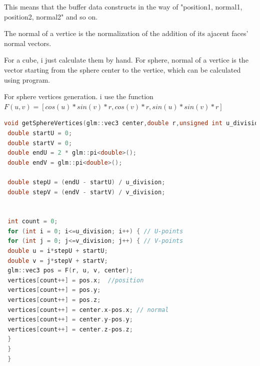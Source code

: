 \documentclass[acmtog]{acmart}
\begin{document}
\par This means that the buffer data constructs in the way of "position1, normal1, position2, normal2" and so on.
\par The normal of a vertice is the normalization of the  addition of its ajacent faces' normal vectors.
\par For a cube, i just calculate them by hand. For sphere, normal of a vertice is the vector starting from the sphere center to the vertice, which can be calculated using program.
\\\par
 For sphere vertices generation. i use the function $F(u, v) = [ cos(u)*sin(v)*r, cos(v)*r, sin(u)*sin(v)*r ]$
 \begin{lstlisting}[frame=single,breaklines=true,language=c++,basicstyle=\footnotesize\ttfamily]
 void getSphereVertices(glm::vec3 center,double r,unsigned int u_division, unsigned int v_division,GLfloat * vertices) {
 double startU = 0;
 double startV = 0;
 double endU = 2 * glm::pi<double>();
 double endV = glm::pi<double>();
 
 double stepU = (endU - startU) / u_division;
 double stepV = (endV - startV) / v_division;
 
 
 int count = 0;
 for (int i = 0; i<=u_division; i++) { // U-points
 for (int j = 0; j<=v_division; j++) { // V-points
 double u = i*stepU + startU;
 double v = j*stepV + startV;
 glm::vec3 pos = F(r, u, v, center);
 vertices[count++] = pos.x;  //position
 vertices[count++] = pos.y; 
 vertices[count++] = pos.z;
 vertices[count++] = center.x-pos.x; // normal
 vertices[count++] = center.y-pos.y;
 vertices[count++] = center.z-pos.z;
 }
 }
 }
 \end{lstlisting}
\end{document}
